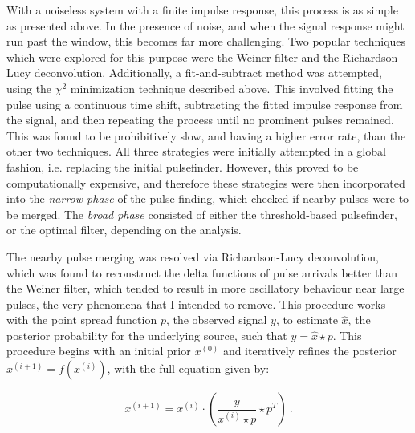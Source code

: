 With a noiseless system with a finite impulse response, this process is as  simple as presented above. 
In the presence of noise, and when the signal response might run past the window, this becomes far more challenging.
Two popular techniques which were explored for this purpose were the Weiner filter\cite{noauthor_extrapolation_nodate} and the Richardson-Lucy deconvolution\cite{richardson_bayesian-based_1972}.
Additionally, a fit-and-subtract method was attempted, using the $\chi^2$ minimization technique described above.
This involved fitting the pulse using a continuous time shift, subtracting the fitted impulse response from the signal, and then repeating the process until no prominent pulses remained.
This was found to be prohibitively slow, and having a higher error rate, than the other two techniques.
All three strategies were initially attempted in a global fashion, i.e. replacing the initial pulsefinder.
However, this proved to be computationally expensive, and therefore these strategies were then incorporated into the \textit{narrow phase} of the pulse finding, which checked if nearby pulses were to be merged.
The \textit{broad phase} consisted of either the threshold-based pulsefinder, or the optimal filter, depending on the analysis.

The nearby pulse merging was resolved via Richardson-Lucy deconvolution, which was found to reconstruct the delta functions of pulse arrivals better than the Weiner filter, which tended to result in more oscillatory behaviour near large pulses, the very phenomena that I intended to remove.
This procedure works with the point spread function $p$, the observed signal $y$, to estimate $\hat{x}$, the posterior probability for the underlying source, such that $y = \hat{x} \star p$.
This procedure begins with an initial prior $x^{(0)}$ and iteratively refines the posterior $x^{(i+1)} = f(x^{(i)})$, with the full equation given by:

\begin{equation}
    x^{(i+1)} = x^{(i)}\cdot(\frac{y}{x^{(i)} \star p} \star p^T )~.
    \label{eq:richardson_lucy}
\end{equation}

